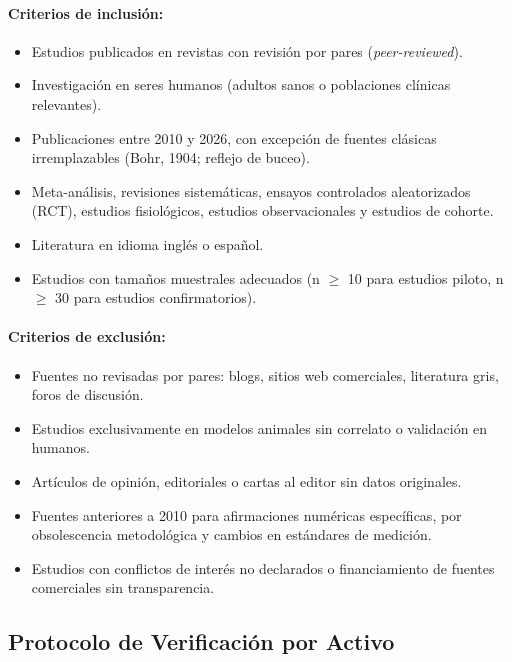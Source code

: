 \documentclass[12pt,a4paper]{article}
\begin{document}
\paragraph{Criterios de inclusión:}
\begin{itemize}[itemsep=2pt]
    \item Estudios publicados en revistas con revisión por pares (\textit{peer-reviewed}).
    \item Investigación en seres humanos (adultos sanos o poblaciones clínicas relevantes).
    \item Publicaciones entre 2010 y 2026, con excepción de fuentes clásicas
          irremplazables (Bohr, 1904; reflejo de buceo).
    \item Meta-análisis, revisiones sistemáticas, ensayos controlados aleatorizados
          (RCT), estudios fisiológicos, estudios observacionales y estudios de cohorte.
    \item Literatura en idioma inglés o español.
    \item Estudios con tamaños muestrales adecuados (n $\geq$ 10 para estudios
          piloto, n $\geq$ 30 para estudios confirmatorios).
\end{itemize}

\paragraph{Criterios de exclusión:}
\begin{itemize}[itemsep=2pt]
    \item Fuentes no revisadas por pares: blogs, sitios web comerciales, literatura
          gris, foros de discusión.
    \item Estudios exclusivamente en modelos animales sin correlato o validación
          en humanos.
    \item Artículos de opinión, editoriales o cartas al editor sin datos originales.
    \item Fuentes anteriores a 2010 para afirmaciones numéricas específicas, por
          obsolescencia metodológica y cambios en estándares de medición.
    \item Estudios con conflictos de interés no declarados o financiamiento de
          fuentes comerciales sin transparencia.
\end{itemize}

\subsection{Protocolo de Verificación por Activo}
\end{document}
